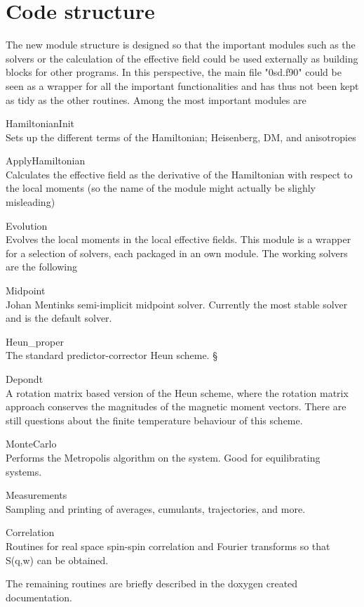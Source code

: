 \documentclass{article}
\begin{document}
\section{Code structure}
The new module structure is designed so that the important modules such as the solvers or the calculation of the effective field could be used externally as building blocks for other programs. In this perspective, the main file "0sd.f90" could be seen as a wrapper for all the important functionalities and has thus not been kept as tidy as the other routines. 
Among the most important modules are
\begin{description}
 \item{HamiltonianInit} \\
 Sets up the different terms of the Hamiltonian; Heisenberg, DM, and anisotropies 
 \item{ApplyHamiltonian} \\
 Calculates the effective field as the derivative of the Hamiltonian with respect to the local moments (so the name of the module might actually be slighly misleading)
 \item{Evolution} \\
 Evolves the local moments in the local effective fields. This module is a wrapper for a selection of solvers, each packaged in an own module. 
The working solvers are the following
 \begin{description}
  \item{Midpoint} \\
  Johan Mentinks semi-implicit midpoint solver. Currently the most stable solver and is the default solver.
  \item{Heun\_proper} \\
  The standard predictor-corrector Heun scheme.
  §\item{Depondt} \\
  A rotation matrix based version of the Heun scheme, where the rotation matrix approach conserves the magnitudes of the magnetic moment vectors. There are still questions about the finite temperature behaviour of this scheme.
 \end{description}
 \item{MonteCarlo} \\
 Performs the Metropolis algorithm on the system. Good for equilibrating systems.
 \item{Measurements} \\
 Sampling and printing of averages, cumulants, trajectories, and more.
 \item{Correlation} \\
 Routines for real space spin-spin correlation and Fourier transforms so that S(q,w) can be obtained.
\end{description}
The remaining routines are briefly described in the doxygen created documentation.
\end{document}
